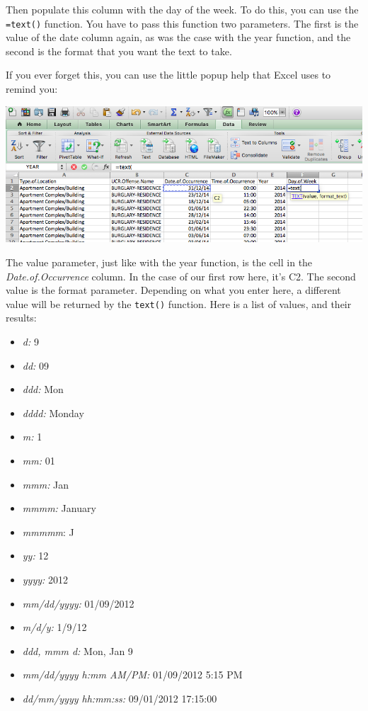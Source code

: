 \documentclass[
]{book}
\providecommand{\tightlist}{%
  \setlength{\itemsep}{0pt}\setlength{\parskip}{0pt}}
\begin{document}
Then populate this column with the day of the week. To do this, you can use the \texttt{=text()} function. You have to pass this function two parameters. The first is the value of the date column again, as was the case with the year function, and the second is the format that you want the text to take.

If you ever forget this, you can use the little popup help that Excel uses to remind you:

\includegraphics{imgs/text_params.png}

The value parameter, just like with the year function, is the cell in the \emph{Date.of.Occurrence} column. In the case of our first row here, it's C2. The second value is the format parameter. Depending on what you enter here, a different value will be returned by the \texttt{text()} function. Here is a list of values, and their results:

\begin{itemize}
\tightlist
\item
  \emph{d:} 9
\item
  \emph{dd:} 09
\item
  \emph{ddd:} Mon
\item
  \emph{dddd:} Monday
\item
  \emph{m:} 1
\item
  \emph{mm:} 01
\item
  \emph{mmm:} Jan
\item
  \emph{mmmm:} January
\item
  \emph{mmmmm}: J
\item
  \emph{yy:} 12
\item
  \emph{yyyy:} 2012
\item
  \emph{mm/dd/yyyy:} 01/09/2012
\item
  \emph{m/d/y:} 1/9/12
\item
  \emph{ddd, mmm d:} Mon, Jan 9
\item
  \emph{mm/dd/yyyy h:mm AM/PM:} 01/09/2012 5:15 PM
\item
  \emph{dd/mm/yyyy hh:mm:ss:} 09/01/2012 17:15:00
\end{itemize}
\end{document}
